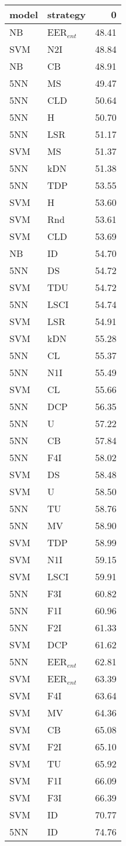 \begin{tabular}{llr}
\toprule
model & strategy & 0 \\
\midrule
NB & EER$_{ent}$ & 48.41 \\
SVM & N2I & 48.84 \\
NB & CB & 48.91 \\
5NN & MS & 49.47 \\
5NN & CLD & 50.64 \\
5NN & H & 50.70 \\
5NN & LSR & 51.17 \\
SVM & MS & 51.37 \\
5NN & kDN & 51.38 \\
5NN & TDP & 53.55 \\
SVM & H & 53.60 \\
SVM & Rnd & 53.61 \\
SVM & CLD & 53.69 \\
NB & ID & 54.70 \\
5NN & DS & 54.72 \\
SVM & TDU & 54.72 \\
5NN & LSCI & 54.74 \\
SVM & LSR & 54.91 \\
SVM & kDN & 55.28 \\
5NN & CL & 55.37 \\
5NN & N1I & 55.49 \\
SVM & CL & 55.66 \\
5NN & DCP & 56.35 \\
5NN & U & 57.22 \\
5NN & CB & 57.84 \\
5NN & F4I & 58.02 \\
SVM & DS & 58.48 \\
SVM & U & 58.50 \\
5NN & TU & 58.76 \\
5NN & MV & 58.90 \\
SVM & TDP & 58.99 \\
SVM & N1I & 59.15 \\
SVM & LSCI & 59.91 \\
5NN & F3I & 60.82 \\
5NN & F1I & 60.96 \\
5NN & F2I & 61.33 \\
SVM & DCP & 61.62 \\
5NN & EER$_{ent}$ & 62.81 \\
SVM & EER$_{ent}$ & 63.39 \\
SVM & F4I & 63.64 \\
SVM & MV & 64.36 \\
SVM & CB & 65.08 \\
SVM & F2I & 65.10 \\
SVM & TU & 65.92 \\
SVM & F1I & 66.09 \\
SVM & F3I & 66.39 \\
SVM & ID & 70.77 \\
5NN & ID & 74.76 \\
\bottomrule
\end{tabular}
